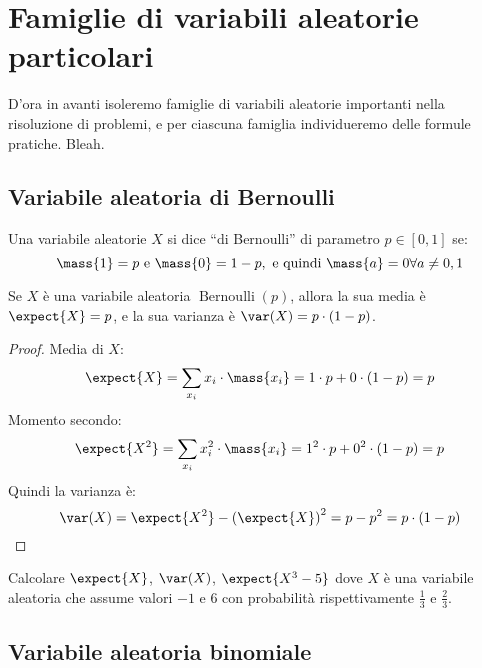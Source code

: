 \section{Famiglie di variabili aleatorie particolari}

D'ora in avanti isoleremo famiglie di variabili aleatorie importanti nella risoluzione di problemi, e per ciascuna famiglia individueremo delle formule pratiche. Bleah.

\subsection{Variabile aleatoria di Bernoulli}

\begin{defn}
Una variabile aleatorie $X$ si dice ``di Bernoulli'' di parametro $p \in [0,1]$ se:
\[
\mass{1} = p \text{ e } \mass{0} = 1 - p, \text{ e quindi } \mass{a} = 0 \forall a \neq 0,1
\]
\end{defn}
\begin{fact}
Se $X$ \`e una variabile aleatoria $\operatorname{Bernoulli}(p)$, allora la sua media \`e $\expect{X} = p$, e la sua varianza \`e $\var (X) = p \cdot (1-p)$.
\end{fact}
\begin{proof}
Media di $X$:
\[
\expect{X} = \sum_{x_i} x_i \cdot \mass{x_i} = 1 \cdot p + 0 \cdot (1 - p) = p
\]
Momento secondo:
\[
\expect{X^2} = \sum_{x_i} x_i^2 \cdot \mass{x_i} = 1^2 \cdot p + 0^2 \cdot (1 - p) = p
\]
Quindi la varianza \`e:
\[
\var (X) = \expect{X^2} - {\left( \expect{X} \right)}^2 = p - p^2 = p \cdot (1 - p)
\]
\end{proof}

\begin{esercizio}
Calcolare $\expect{X}$, $\var (X)$, $\expect{X^3 - 5}$ dove $X$ \`e una variabile aleatoria che assume valori $-1$ e $6$ con probabilit\`a rispettivamente $\frac{1}{3}$ e $\frac{2}{3}$.
\end{esercizio}

\subsection{Variabile aleatoria binomiale}

